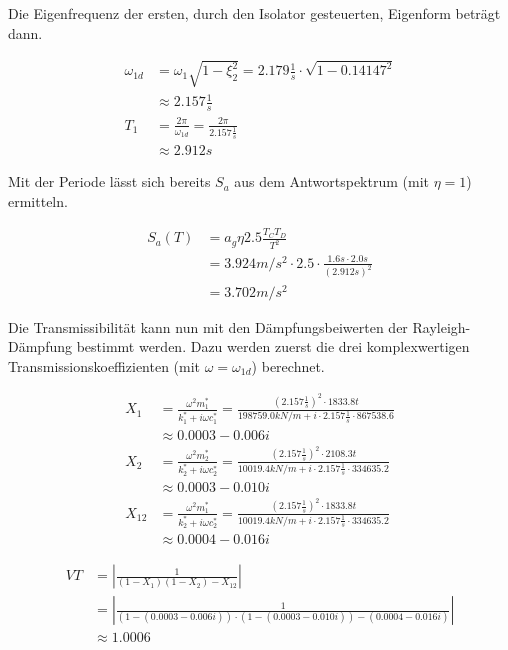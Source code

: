 Die Eigenfrequenz der ersten, durch den Isolator gesteuerten, Eigenform beträgt dann.

\begin{align*}
\omega_{1d} &= \omega_1 \sqrt{1 - \xi_2^2} = 2.179 \frac{1}{s} \cdot \sqrt{1 - 0.14147^2}\\
            &\approx 2.157 \frac{1}{s}\\
T_1         &= \frac{2 \pi}{\omega_{1d}} = \frac{2 \pi}{2.157 \frac{1}{s}}\\
            &\approx 2.912 s
\end{align*}

\pagebreak

Mit der Periode lässt sich bereits $S_a$ aus dem Antwortspektrum (mit $\eta=1$) ermitteln.

\begin{align*}
S_a(T) &= a_g \eta 2.5 \frac{T_C T_D}{T^2}\\
       &= 3.924 m/s^2 \cdot 2.5 \cdot \frac{1.6 s \cdot 2.0 s}{(2.912 s)^2}\\
       &= 3.702 m/s^2
\end{align*}

Die Transmissibilität kann nun mit den Dämpfungsbeiwerten der Rayleigh-Dämpfung bestimmt werden. Dazu werden zuerst die drei komplexwertigen Transmissionskoeffizienten (mit $\omega = \omega_{1d}$) berechnet.

\begin{align*}
X_1 &= \frac{\omega^2 m_1^*}{k_1^* + i \omega c_1^*} = \frac{(2.157 \frac{1}{s})^2 \cdot 1833.8 t}{198759.0kN/m + i \cdot 2.157 \frac{1}{s} \cdot 867538.6}\\
    &\approx 0.0003 - 0.006i\\[2em]
X_2 &= \frac{\omega^2 m_2^*}{k_2^* + i \omega c_2^*} = \frac{(2.157 \frac{1}{s})^2 \cdot 2108.3 t}{10019.4kN/m + i \cdot 2.157 \frac{1}{s} \cdot 334635.2}\\
    &\approx 0.0003 - 0.010i\\[2em]
X_{12} &= \frac{\omega^2 m_1^*}{k_2^* + i \omega c_2^*} = \frac{(2.157 \frac{1}{s})^2 \cdot 1833.8 t}{10019.4kN/m + i \cdot 2.157 \frac{1}{s} \cdot 334635.2}\\
    &\approx 0.0004 - 0.016i
\end{align*}

\begin{align*}
VT &= \left\lvert \frac{1}{(1 - X_1)(1 - X_2) - X_{12}} \right\rvert\\
   &= \left\lvert \frac{1}{(1 - (0.0003 - 0.006i)) \cdot (1 - (0.0003 - 0.010i)) - (0.0004 - 0.016i)} \right\rvert\\
   &\approx 1.0006
\end{align*}

